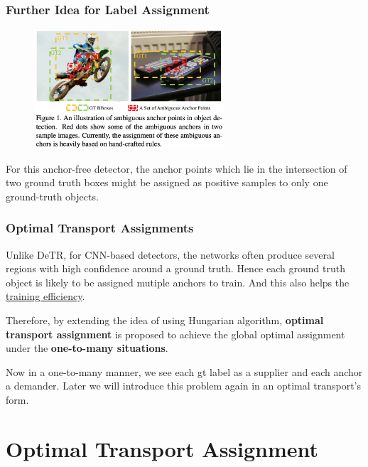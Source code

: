 \documentclass[slidetop, mathserif, dvipsnames]{beamer}
\begin{document}
\begin{frame}
    \frametitle{Further Idea for Label Assignment}

    \begin{figure}
    \includegraphics[width=200pt]{pics/ota_motivation.png}
    \end{figure}

    For this anchor-free detector, the anchor points which lie in the
    intersection of two ground truth boxes might be assigned as positive
    samples to only one ground-truth objects.

\end{frame}

\begin{frame}
    \frametitle{Optimal Transport Assignments}

    Unlike DeTR, for CNN-based detectors, the networks often produce
    several regions with high confidence around a ground truth.
    Hence each ground truth object is likely to be assigned mutiple anchors
    to train. And this also helps the \underline{training efficiency}.

    \quad

    Therefore, by extending the idea of using Hungarian algorithm,
    {\bf optimal transport assignment} is proposed
    to achieve the global optimal assignment under
    the {\bf one-to-many situations}.

    \quad 

    Now in a one-to-many manner, we see each gt label as a supplier and each
    anchor a demander.
    Later we will introduce this problem again in an optimal transport's form.

\end{frame}


\section{Optimal Transport Assignment}
\end{document}
